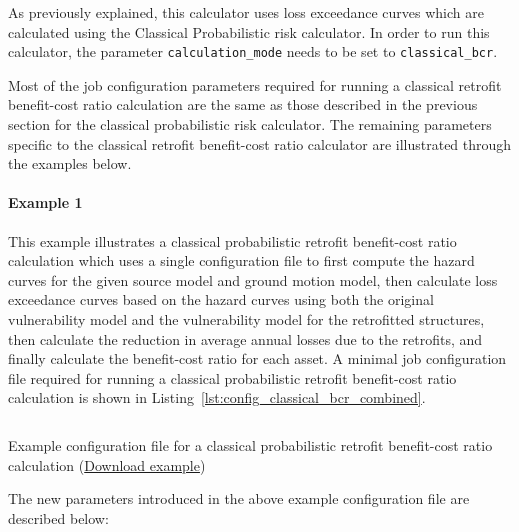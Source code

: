 As previously explained, this calculator uses loss exceedance curves which are
calculated using the Classical Probabilistic risk calculator. In order to run
this calculator, the parameter \Verb+calculation_mode+ needs to be set to
\Verb+classical_bcr+.

Most of the job configuration parameters required for running a classical
retrofit benefit-cost ratio calculation are the same as those described in the
previous section for the classical probabilistic risk calculator. The
remaining parameters specific to the classical retrofit benefit-cost ratio
calculator are illustrated through the examples below.

\paragraph{Example 1}

This example illustrates a classical probabilistic retrofit benefit-cost ratio
calculation which uses a single configuration file to first compute the hazard
curves for the given source model and ground motion model, then calculate loss
exceedance curves based on the hazard curves using both the original
vulnerability model and the vulnerability model for the retrofitted
structures, then calculate the reduction in average annual losses due to the
retrofits, and finally calculate the benefit-cost ratio for each asset. A
minimal job configuration file required for running a classical probabilistic
retrofit benefit-cost ratio calculation is shown in
Listing~\ref{lst:config_classical_bcr_combined}.

\begin{listing}[htbp]
  \inputminted[firstline=1,firstnumber=1,fontsize=\footnotesize,frame=single,linenos,bgcolor=lightgray,label=job.ini]{ini}{oqum/risk/verbatim/config_classical_bcr_combined.ini}
  \caption{Example configuration file for a classical probabilistic retrofit benefit-cost ratio calculation (\href{https://raw.githubusercontent.com/GEMScienceTools/oq-engine-docs/master/oqum/risk/verbatim/config_classical_bcr_combined.xml}{Download example})}
  \label{lst:config_classical_bcr_combined}
\end{listing}

The new parameters introduced in the above example configuration file are
described below:


